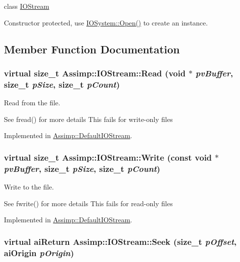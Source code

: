 class \hyperlink{class_assimp_1_1_i_o_stream}{IOStream} 

Constructor protected, use \hyperlink{class_assimp_1_1_i_o_system_c512ece3b0701de5682553007a4c0816}{IOSystem::Open()} to create an instance. 

\subsection{Member Function Documentation}
\hypertarget{class_assimp_1_1_i_o_stream_e376f641020989d61863b9c6f55c7abf}{
\subsubsection[Read]{\setlength{\rightskip}{0pt plus 5cm}virtual size\_\-t Assimp::IOStream::Read (void $\ast$ {\em pvBuffer}, \/  size\_\-t {\em pSize}, \/  size\_\-t {\em pCount})}}
\label{class_assimp_1_1_i_o_stream_e376f641020989d61863b9c6f55c7abf}


Read from the file. 

See fread() for more details This fails for write-only files 

Implemented in \hyperlink{class_assimp_1_1_default_i_o_stream_a45b659531f179122c7e7852ad6f5f14}{Assimp::DefaultIOStream}.\hypertarget{class_assimp_1_1_i_o_stream_d0ca4aae1b8c4d00db391ac3a4171f7b}{
\subsubsection[Write]{\setlength{\rightskip}{0pt plus 5cm}virtual size\_\-t Assimp::IOStream::Write (const void $\ast$ {\em pvBuffer}, \/  size\_\-t {\em pSize}, \/  size\_\-t {\em pCount})}}
\label{class_assimp_1_1_i_o_stream_d0ca4aae1b8c4d00db391ac3a4171f7b}


Write to the file. 

See fwrite() for more details This fails for read-only files 

Implemented in \hyperlink{class_assimp_1_1_default_i_o_stream_05de25f9ac717801fbd0aad06499657a}{Assimp::DefaultIOStream}.\hypertarget{class_assimp_1_1_i_o_stream_5ed0dddf418ab08cf3fc21f3f3032220}{
\subsubsection[Seek]{\setlength{\rightskip}{0pt plus 5cm}virtual {\bf aiReturn} Assimp::IOStream::Seek (size\_\-t {\em pOffset}, \/  {\bf aiOrigin} {\em pOrigin})}}
\label{class_assimp_1_1_i_o_stream_5ed0dddf418ab08cf3fc21f3f3032220}


